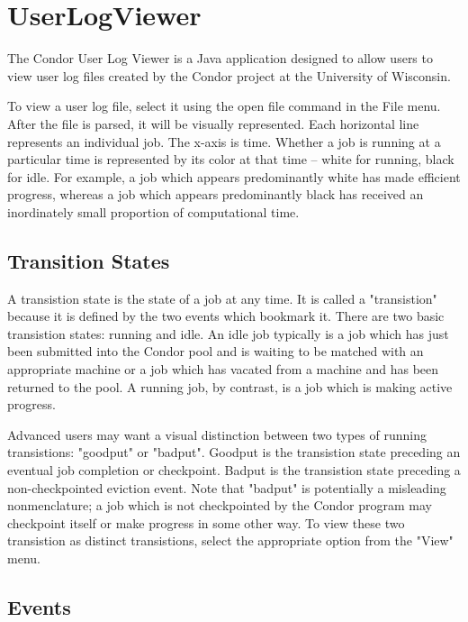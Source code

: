 

%

\section{UserLogViewer}

The Condor User Log Viewer is a Java application designed to allow users to view user log files created by the Condor project at the University of Wisconsin. 

To view a user log file, select it using the open file command in the File menu.  After the file is parsed, it will be visually represented.  Each horizontal line represents an individual job.  The x-axis
is time.  Whether a job is running at a particular time is represented by its color at that time -- white for running, black for idle.  For example, a job which appears predominantly white has made
efficient progress, whereas a job which appears predominantly black has received an inordinately small proportion of computational time. 


\subsection{\label{sec:transition-states}Transition States}

A transistion state is the state of a job at any time.  It is called a "transistion" because it is defined by the two events which bookmark it.  There are two basic transistion states: running and idle. 
An idle job typically is a job which has just been submitted into the Condor pool and is waiting to be matched with an appropriate machine or a job which has vacated from a machine and has been
returned to the pool.  A running job, by contrast, is a job which is making active progress. 

Advanced users may want a visual distinction between two types of running transistions: "goodput" or "badput".  Goodput is the transistion state preceding an eventual job completion or
checkpoint.  Badput is the transistion state preceding a non-checkpointed eviction event.  Note that "badput" is potentially a misleading nonmenclature; a job which is not checkpointed by the
Condor program may checkpoint itself or make progress in some other way.  To view these two transistion as distinct transistions, select the appropriate option from the "View" menu. 


\subsection{\label{sec:events}Events}

